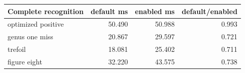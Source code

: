 \begin{center}
\small
\begin{tabular}{lrrr}
\toprule
Complete recognition & default ms & enabled ms & default/enabled\\
\midrule
optimized positive & 50.490 & 50.988 & 0.993\\
genus one miss & 20.867 & 29.597 & 0.721\\
trefoil & 18.081 & 25.402 & 0.711\\
figure eight & 32.220 & 43.575 & 0.738\\
\bottomrule
\end{tabular}
\end{center}
